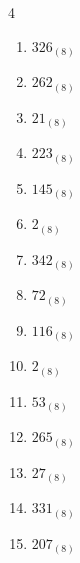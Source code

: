 \begin{multicols}{4}
\begin{enumerate}
        \phantom{$=4$}

\columnbreak %

  \item $326_{(8)}$

        \phantom{$=214$}

  \item $262_{(8)}$

        \phantom{$=178$}

  \item $21_{(8)}$

        \phantom{$=17$}

  \item $223_{(8)}$

        \phantom{$=147$}

  \item $145_{(8)}$

        \phantom{$=101$}

  \item $2_{(8)}$

        \phantom{$=2$}

  \item $342_{(8)}$

        \phantom{$=226$}

  \item $72_{(8)}$

        \phantom{$=58$}

  \item $116_{(8)}$

        \phantom{$=78$}

  \item $2_{(8)}$

        \phantom{$=2$}

  \item $53_{(8)}$

        \phantom{$=43$}

  \item $265_{(8)}$

        \phantom{$=181$}

  \item $27_{(8)}$

        \phantom{$=23$}

  \item $331_{(8)}$

        \phantom{$=217$}

  \item $207_{(8)}$

        \phantom{$=135$}


\end{enumerate}
\end{multicols}
